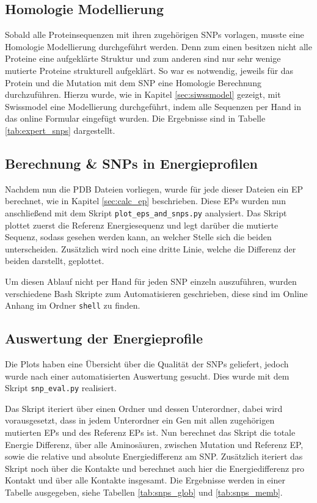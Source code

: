 \subsection{Homologie Modellierung}
Sobald alle Proteinsequenzen mit ihren zugehörigen \ac{SNP}s vorlagen, musste eine Homologie Modellierung durchgeführt werden. Denn zum einen besitzen nicht alle Proteine eine aufgeklärte Struktur und zum anderen sind nur sehr wenige mutierte Proteine strukturell aufgeklärt. So war es notwendig, jeweils für das Protein und die Mutation mit dem \ac{SNP} eine Homologie Berechnung durchzuführen. Hierzu wurde, wie in Kapitel \ref{sec:siwssmodel} gezeigt, mit Swissmodel eine Modellierung durchgeführt, indem alle Sequenzen per Hand in das online Formular eingefügt wurden. Die Ergebnisse sind in Tabelle \ref{tab:expert_snps} dargestellt.


\subsection{Berechnung \& SNPs in Energieprofilen}
\label{sec:plot_eps}
Nachdem nun die \ac{PDB} Dateien vorliegen, wurde für jede dieser Dateien ein \ac{EP} berechnet, wie in Kapitel \ref{sec:calc_ep} beschrieben. Diese \ac{EP}s wurden nun anschließend mit dem Skript \texttt{plot\_eps\_and\_snps.py} analysiert. Das Skript plottet zuerst die Referenz Energiesequenz und legt darüber die mutierte Sequenz, sodass gesehen werden kann, an welcher Stelle sich die beiden unterscheiden. Zusätzlich wird noch eine dritte Linie, welche die Differenz der beiden darstellt, geplottet.

Um diesen Ablauf nicht per Hand für jeden \ac{SNP} einzeln auszuführen, wurden verschiedene Bash Skripte zum Automatisieren geschrieben, diese sind im Online Anhang im Ordner \texttt{shell} zu finden.


\subsection{Auswertung der Energieprofile}
\label{sec:auswertung_eps}
Die Plots haben eine Übersicht über die Qualität der \ac{SNP}s geliefert, jedoch wurde nach einer automatisierten Auswertung gesucht. Dies wurde mit dem Skript \texttt{snp\_eval.py} realisiert.

Das Skript iteriert über einen Ordner und dessen Unterordner, dabei wird vorausgesetzt, dass in jedem Unterordner ein Gen mit allen zugehörigen mutierten \ac{EP}s und des Referenz \ac{EP}s ist. Nun berechnet das Skript die totale Energie Differenz, über alle Aminosäuren, zwischen Mutation und Referenz \ac{EP}, sowie die relative und absolute Energiedifferenz am \ac{SNP}. Zusätzlich iteriert das Skript noch über die Kontakte und berechnet auch hier die Energiedifferenz pro Kontakt und über alle Kontakte insgesamt. Die Ergebnisse werden in einer Tabelle ausgegeben, siehe Tabellen \ref{tab:snps_glob} und \ref{tab:snps_memb}.


